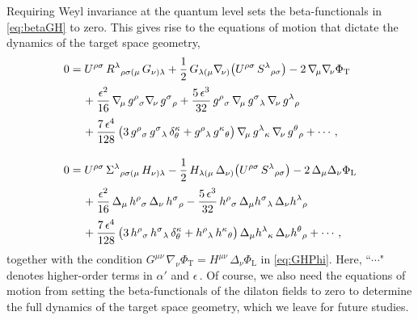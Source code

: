 \documentclass[11pt]{article}
\newcommand{\lr}{\left (}
\newcommand{\rr}{\right )}
\begin{document}
Requiring Weyl invariance at the quantum level sets the beta-functionals in \eqref{eq:betaGH} to zero. This gives rise to the equations of motion that dictate the dynamics of the target space geometry,
%
\begin{subequations} \label{eq:speom}
\begin{align}
	0 & = U^{\rho\sigma} \, R^\lambda{}_{\rho\sigma(\mu} \, G_{\nu)\lambda}
		+ \frac{1}{2} \, G_{\lambda(\mu} \nabla_{\!\nu)} \! \lr U^{\rho\sigma} \, S^\lambda{}_{\rho\sigma} \rr - 2 \, \nabla_{\!\mu} \nabla_{\!\nu} \Phi_\text{T} \notag \\[2pt]
	& \quad\, + \frac{\epsilon^2}{16} \, \nabla_{\!\mu} \, g^\rho{}_\sigma \nabla_{\!\nu} \, g^\sigma{}_{\rho}
		+ \frac{5 \, \epsilon^3}{32} \, g^\rho{}_\sigma \, \nabla_{\!\mu} \, g^\sigma{}_{\lambda} \, \nabla_{\!\nu} \, g^\lambda{}_{\rho} \notag \\[2pt]
	& \quad\, + \frac{7 \, \epsilon^4}{128} \, \bigl( 3 \, g^{\rho}{}_\sigma  \, g^\sigma{}_{\lambda} \, \delta^\kappa_\theta + g^\rho{}_\lambda \, g^\kappa{}_\theta \bigr) \, \nabla_{\!\mu} \, g^\lambda{}_{\kappa}  \, \nabla_{\!\nu} \, g^\theta{}_{\rho}
		+ \cdots\,, \\[10pt]
	0 & = U^{\rho\sigma} \, \Sigma^\lambda{}_{\rho\sigma(\mu} \, H_{\nu)\lambda}
		- \frac{1}{2} \, H_{\lambda(\mu} \, \Delta_{\nu)} \! \lr U^{\rho\sigma} \, S^\lambda{}_{\rho\sigma} \rr - 2 \, \Delta_{\mu} \Delta_{\nu} \Phi_\text{L} \notag \\[2pt]
		& \quad\, + \frac{\epsilon^2}{16} \, \Delta_{\mu} \, h^\rho{}_\sigma\, \Delta_{\nu} \, h^\sigma{}_{\rho}
		- \frac{5 \, \epsilon^3}{32} \, h^\rho{}_\sigma \, \Delta_{\mu} h^\sigma{}_{\lambda} \, \Delta_{\nu} h^\lambda{}_{\rho} \notag \\[2pt]
		& \quad\, + \frac{7 \, \epsilon^4}{128} \, \bigl( 3 \, h^{\rho}{}_\sigma  \, h^\sigma{}_{\lambda} \, \delta^\kappa_\theta + h^\rho{}_\lambda \, h^\kappa{}_\theta \bigr) \, \Delta_{\mu} h^\lambda{}_{\kappa}  \, \Delta_{\nu} h^\theta{}_{\rho} 
		+ \cdots\,,
\end{align}
\end{subequations}
%
together with the condition $G^{\mu\nu} \, \nabla_{\!\nu} \Phi_\text{T} = H^{\mu\nu} \, \Delta_\nu \Phi_\text{L}$ in \eqref{eq:GHPhi}. Here, ``$\cdots$" denotes higher-order terms in $\alpha'$ and $\epsilon$\,. Of course, we also need the equations of motion from setting the beta-functionals of the dilaton fields to zero to determine the full dynamics of the target space geometry, which we leave for future studies.
\end{document}
